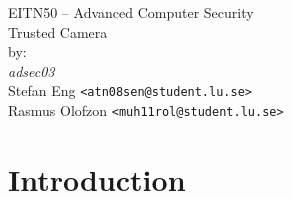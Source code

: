 \documentclass[10pt]{article}
\begin{document}

  \thispagestyle{empty}
  \vspace*{3cm}
  \begin{center}
    \huge{EITN50 -- Advanced Computer Security} \\
    \vspace{0.3cm}
    \LARGE{Trusted Camera} \\
    \vspace{1cm}
    \large{by: \\ \vspace{0.2cm}
	\textit{adsec03} \\
        Stefan Eng \texttt{<atn08sen@student.lu.se>} \\
        Rasmus Olofzon \texttt{<muh11rol@student.lu.se>}
        } \\
  \end{center}


  \newpage

  \section{Introduction}


\end{document}
